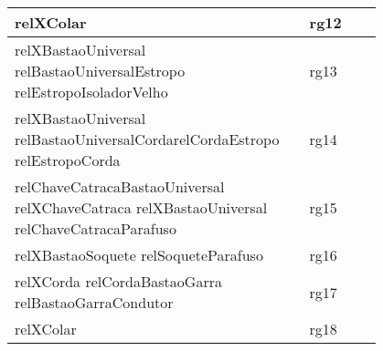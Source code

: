 \begin{table}[H]
\begin{tabular}{|p{0.8\linewidth}|l|}
relXColar                                                                                                                                                                                                                                                                                                                                 & rg12        \\ \hline
relXBastaoUniversal relBastaoUniversalEstropo relEstropoIsoladorVelho                                                                                                                                                                                                                                                                     & rg13        \\ \hline
relXBastaoUniversal relBastaoUniversalCordarelCordaEstropo relEstropoCorda                                                                                                                                                                                                                                                                & rg14        \\ \hline
relChaveCatracaBastaoUniversal relXChaveCatraca relXBastaoUniversal relChaveCatracaParafuso                                                                                                                                                                                                                                               & rg15        \\ \hline
relXBastaoSoquete relSoqueteParafuso                                                                                                                                                                                                                                                                                                      & rg16        \\ \hline
relXCorda relCordaBastaoGarra relBastaoGarraCondutor                                                                                                                                                                                                                                                                                      & rg17        \\ \hline
relXColar                                                                                                                                                                                                                                                                                                                                 & rg18        \\ \hline

\end{tabular}
\end{table}
